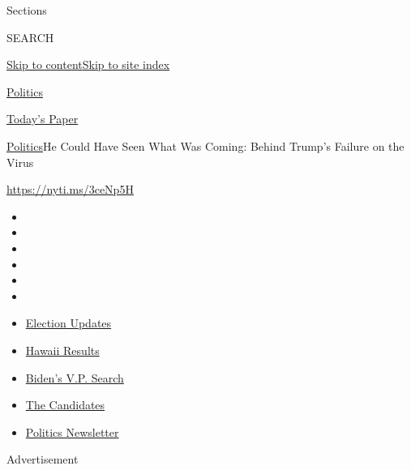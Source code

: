 Sections

SEARCH

\protect\hyperlink{site-content}{Skip to
content}\protect\hyperlink{site-index}{Skip to site index}

\href{https://www.nytimes.com/section/politics}{Politics}

\href{https://myaccount.nytimes.com/auth/login?response_type=cookie\&client_id=vi}{}

\href{https://www.nytimes.com/section/todayspaper}{Today's Paper}

\href{/section/politics}{Politics}\textbar{}He Could Have Seen What Was
Coming: Behind Trump's Failure on the Virus

\href{https://nyti.ms/3ceNp5H}{https://nyti.ms/3ceNp5H}

\begin{itemize}
\item
\item
\item
\item
\item
\item
\end{itemize}

\begin{itemize}
\item
  \href{https://www.nytimes.com/2020/08/07/us/elections/biden-vs-trump.html?action=click\&pgtype=Article\&state=default\&region=TOP_BANNER\&context=storylines_menu}{Election
  Updates}
\item
  \href{https://www.nytimes.com/interactive/2020/08/08/us/elections/results-hawaii-primary-elections.html?action=click\&pgtype=Article\&state=default\&region=TOP_BANNER\&context=storylines_menu}{Hawaii
  Results}
\item
  \href{https://www.nytimes.com/article/biden-vice-president-2020.html?action=click\&pgtype=Article\&state=default\&region=TOP_BANNER\&context=storylines_menu}{Biden's
  V.P. Search}
\item
  \href{https://www.nytimes.com/interactive/2019/us/politics/2020-presidential-candidates.html?action=click\&pgtype=Article\&state=default\&region=TOP_BANNER\&context=storylines_menu}{The
  Candidates}
\item
  \href{https://www.nytimes.com/newsletters/politics?action=click\&pgtype=Article\&state=default\&region=TOP_BANNER\&context=storylines_menu}{Politics
  Newsletter}
\end{itemize}

Advertisement

